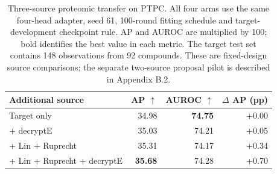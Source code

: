 \begin{table}[htbp]
\caption{Three-source proteomic transfer on PTPC. All four arms use the same four-head adapter, seed 61, 100-round fitting schedule and target-development checkpoint rule. AP and AUROC are multiplied by 100; bold identifies the best value in each metric. The target test set contains 148 observations from 92 compounds. These are fixed-design source comparisons; the separate two-source proposal pilot is described in Appendix B.2.}
\label{tab:supplemental-protein-three-source}
\centering\small
\setlength{\tabcolsep}{5pt}
\begin{tabularx}{\linewidth}{@{}Xrrr@{}}
\toprule
Additional source & AP $\uparrow$ & AUROC $\uparrow$ & $\Delta$ AP (pp) \\
\midrule
Target only & 34.98 & \textbf{74.75} & +0.00 \\
+ decryptE & 35.03 & 74.21 & +0.05 \\
+ Lin + Ruprecht & 35.31 & 74.17 & +0.34 \\
+ Lin + Ruprecht + decryptE & \textbf{35.68} & 74.28 & +0.70 \\
\bottomrule
\end{tabularx}
\end{table}
